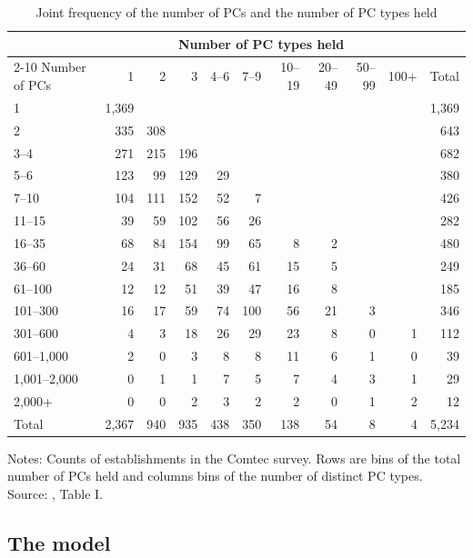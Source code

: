 \begin{table}[htbp]
\centering
\caption{Joint frequency of the number of PCs and the number of PC types held \citep[Table I]{Hendel1994}}
\label{tab:07-hendel-freq}
\small
\setlength{\tabcolsep}{4.5pt}
\begin{tabular}{lrrrrrrrrrr}
\toprule
 & \multicolumn{9}{c}{Number of PC types held} & \\
\cmidrule(lr){2-10}
Number of PCs & 1 & 2 & 3 & 4--6 & 7--9 & 10--19 & 20--49 & 50--99 & 100+ & Total \\
\midrule
1 & 1,369 & & & & & & & & & 1,369 \\
2 & 335 & 308 & & & & & & & & 643 \\
3--4 & 271 & 215 & 196 & & & & & & & 682 \\
5--6 & 123 & 99 & 129 & 29 & & & & & & 380 \\
7--10 & 104 & 111 & 152 & 52 & 7 & & & & & 426 \\
11--15 & 39 & 59 & 102 & 56 & 26 & & & & & 282 \\
16--35 & 68 & 84 & 154 & 99 & 65 & 8 & 2 & & & 480 \\
36--60 & 24 & 31 & 68 & 45 & 61 & 15 & 5 & & & 249 \\
61--100 & 12 & 12 & 51 & 39 & 47 & 16 & 8 & & & 185 \\
101--300 & 16 & 17 & 59 & 74 & 100 & 56 & 21 & 3 & & 346 \\
301--600 & 4 & 3 & 18 & 26 & 29 & 23 & 8 & 0 & 1 & 112 \\
601--1,000 & 2 & 0 & 3 & 8 & 8 & 11 & 6 & 1 & 0 & 39 \\
1,001--2,000 & 0 & 1 & 1 & 7 & 5 & 7 & 4 & 3 & 1 & 29 \\
2,000+ & 0 & 0 & 2 & 3 & 2 & 2 & 0 & 1 & 2 & 12 \\
\midrule
Total & 2,367 & 940 & 935 & 438 & 350 & 138 & 54 & 8 & 4 & 5,234 \\
\bottomrule
\end{tabular}
\par\medskip
\parbox{\linewidth}{\footnotesize Notes: Counts of establishments in the Comtec survey. Rows are bins of the total
number of PCs held and columns bins of the number of distinct PC types. Source: \citet{Hendel1994}, Table I.}
\end{table}

\subsection{The model}\label{sec:07-hendel-model}

